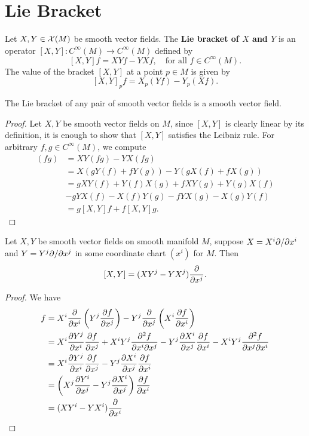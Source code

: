 \section{Lie Bracket}
\begin{definition}
    Let $X,Y \in \mathcal{X}(M)$ be smooth vector fields. The \textbf{Lie bracket of $X$ and $Y$} is an operator $[X,Y] : C^\infty(M) \to C^\infty(M)$ defined by 
    \[
        [X,Y]f = XYf - YXf,\quad \text{for all }f \in C^\infty(M).
    \]
    The value of the bracket $[X,Y]$ at a point $p \in M$ is given by 
    \[
        [X,Y]_pf = X_p(Yf) - Y_p(Xf).
    \]
\end{definition}
\begin{lemma}
    The Lie bracket of any pair of smooth vector fields is a smooth vector field.
\end{lemma}
\begin{proof}
    Let $X,Y$ be smooth vector fields on $M$, since $[X,Y]$ is clearly linear by its definition, it is enough to show that $[X,Y]$ satisfies the Leibniz rule. For arbitrary $f,g \in C^\infty(M)$, we compute
    \begin{align*}
        [X,Y](fg) &= XY(fg) - YX(fg)\\
        &= X(gY(f) + fY(g)) - Y(gX(f) + fX(g))\\
        &= gXY(f) +Y(f)X(g) + fXY(g) + Y(g) X(f)\\
        &- gYX(f) - X(f)Y(g)- fYX(g) - X(g)Y(f)\\
        &= g[X,Y]f + f[X,Y]g.
    \end{align*}
\end{proof}
\begin{proposition}
    Let $X,Y$ be smooth vector fields on smooth manifold $M$, suppose $X = X^i \partial/\partial x^i$ and $Y = Y^j \partial/ \partial x^j$ in some coordinate chart $(x^i)$ for $M$. Then 
    \[
        [X,Y] = (XY^j - YX^j)\frac{\partial}{\partial x^j}.
    \]
\end{proposition}
\begin{proof}
    We have 
    \begin{align*}
        [X,Y]f &= X^i \frac{\pa}{\pa x^i}\left(Y^j\frac{\pa f}{\pa x^j}\right) - Y^j\frac{\pa}{\pa x^j}\left(X^i \frac{\pa f}{\pa x^i}\right)\\
        &= X^i\frac{\pa Y^j}{\pa x^i}  \frac{\pa f}{\pa x^j}+ X^iY^j\frac{\pa^2 f}{\pa x^i \pa x^j}- Y^j\frac{\pa X^i}{\pa x^j}\frac{\pa f}{\pa x^i} - X^iY^j\frac{\pa^2 f}{\pa x^j\pa x^i}\\
        &= X^i\frac{\pa Y^j}{\pa x^i}  \frac{\pa f}{\pa x^j} - Y^j\frac{\pa X^i}{\pa x^j}\frac{\pa f}{\pa x^i}\\
        &= \left(X^j\frac{\pa Y^i}{\pa x^j} - Y^j \frac{\pa X^i}{\pa x^j}\right)\frac{\pa f}{\pa x^i}\\
        &= (XY^i - YX^i)\frac{\pa}{\pa x^i}
    \end{align*}
\end{proof}
